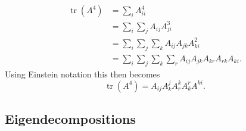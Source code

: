\documentclass{article}
\begin{document}
\begin{enumerate}
\begin{itemize}
		$$
		\begin{aligned}
		\operatorname{tr}(A^4) &= \sum_i A^4_{ii} \\
		&= \sum_i \sum_j A_{ij} A^3_{ji} \\
		&= \sum_i \sum_j \sum_k A_{ij} A_{jk} A^2_{ki} \\
		&= \sum_i \sum_j \sum_k \sum_r A_{ij} A_{jk} A_{kr} A_{rk} A_{ki}.
		\end{aligned}
		$$
		Using Einstein notation this then becomes
		$$
		\operatorname{tr}(A^4) = A_{ij} A^j_k A^k_r A^r_k A^{ki}.
		$$
	\end{itemize}
\end{enumerate}

\subsection{Eigendecompositions}
\end{document}
